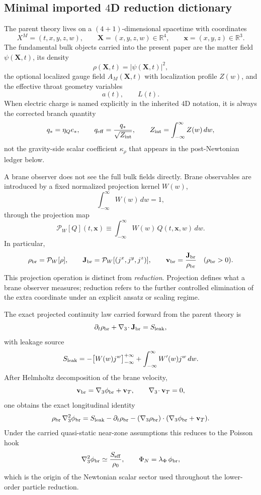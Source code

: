 \documentclass[11pt]{article}
\begin{document}
\subsection{Minimal imported \texorpdfstring{$4$}{4}D reduction dictionary}
\label{sec:dictionary-4d}

The parent theory lives on a $(4+1)$-dimensional spacetime with coordinates
\[
X^M=(t,x,y,z,w),
\qquad
\mathbf{X}=(x,y,z,w)\in\mathbb R^4,
\qquad
\mathbf{x}=(x,y,z)\in\mathbb R^3.
\]
The fundamental bulk objects carried into the present paper are the matter field
$\psi(\mathbf{X},t)$, its density
\[
\rho(\mathbf{X},t)=|\psi(\mathbf{X},t)|^2,
\]
the optional localized gauge field $A_M(\mathbf{X},t)$ with localization profile
$Z(w)$, and the effective throat geometry variables
\[
a(t),\qquad L(t).
\]
When electric charge is named explicitly in the inherited $4$D notation, it is
always the corrected branch quantity
\[
q_* = \eta_Q e_*,
\qquad
q_{\rm eff}=\frac{q_*}{\sqrt{Z_{\rm int}}},
\qquad
Z_{\rm int}=\int_{-\infty}^{\infty} Z(w)\,dw,
\]
not the gravity-side scalar coefficient $\kappa_\rho$ that appears in the
post-Newtonian ledger below.

A brane observer does not see the full bulk fields directly.  Brane observables
are introduced by a fixed normalized projection kernel $W(w)$,
\[
\int_{-\infty}^{\infty} W(w)\,dw = 1,
\]
through the projection map
\[
\mathcal P_W[Q](t,\mathbf{x})
\equiv
\int_{-\infty}^{\infty} W(w)\,Q(t,\mathbf{x},w)\,dw.
\]
In particular,
\[
\rho_{\rm br}=\mathcal P_W[\rho],
\qquad
\mathbf J_{\rm br}=\mathcal P_W[(j^x,j^y,j^z)],
\qquad
\mathbf v_{\rm br}=\frac{\mathbf J_{\rm br}}{\rho_{\rm br}}
\quad (\rho_{\rm br}>0).
\]
This projection operation is distinct from \emph{reduction}.  Projection defines
what a brane observer measures; reduction refers to the further controlled
elimination of the extra coordinate under an explicit ansatz or scaling regime.

The exact projected continuity law carried forward from the parent theory is
\[
\partial_t\rho_{\rm br}+\nabla_3\!\cdot\mathbf J_{\rm br}=S_{\rm leak},
\]
with leakage source
\[
S_{\rm leak}
=
-\bigl[W(w)j^w\bigr]_{-\infty}^{+\infty}
+
\int_{-\infty}^{\infty} W'(w)j^w\,dw.
\]
After Helmholtz decomposition of the brane velocity,
\[
\mathbf v_{\rm br}=\nabla_3\phi_{\rm br}+\mathbf v_T,
\qquad
\nabla_3\!\cdot\mathbf v_T=0,
\]
one obtains the exact longitudinal identity
\[
\rho_{\rm br}\,\nabla_3^2\phi_{\rm br}
=
S_{\rm leak}
-\partial_t\rho_{\rm br}
-(\nabla_3\rho_{\rm br})\cdot(\nabla_3\phi_{\rm br}+\mathbf v_T).
\]
Under the carried quasi-static near-zone assumptions this reduces to the Poisson
hook
\[
\nabla_3^2\phi_{\rm br}\simeq \frac{S_{\rm eff}}{\rho_0},
\qquad
\Phi_N=\lambda_\Phi\,\phi_{\rm br},
\]
which is the origin of the Newtonian scalar sector used throughout the lower-order
particle reduction.
\end{document}
